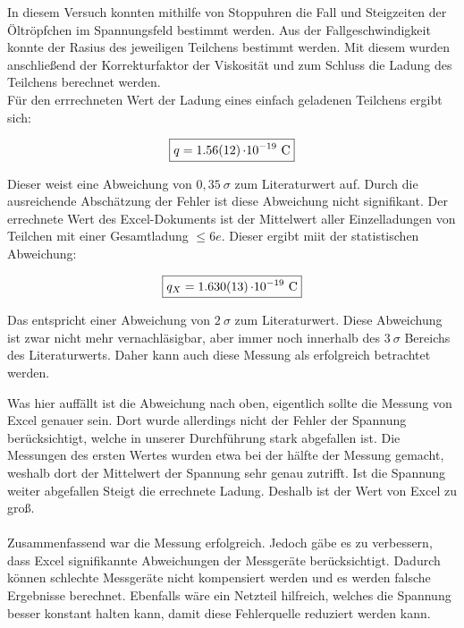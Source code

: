 In diesem Versuch konnten mithilfe von Stoppuhren die Fall und Steigzeiten der Öltröpfchen im Spannungsfeld bestimmt werden.
Aus der Fallgeschwindigkeit konnte der Rasius des jeweiligen Teilchens bestimmt werden.
Mit diesem wurden anschließend der Korrekturfaktor der Viskosität und zum Schluss die Ladung des Teilchens berechnet werden.\\
Für den errrechneten Wert der Ladung eines einfach geladenen Teilchens ergibt sich:

\[\boxed{q = \SI{1,56 \pm 0.12}{\cdot 10^{-19}\ \coulomb}}\]

Dieser weist eine Abweichung von $0,35\ \sigma$ zum Literaturwert auf.
Durch die ausreichende Abschätzung der Fehler ist diese Abweichung nicht signifikant.
Der errechnete Wert des Excel-Dokuments ist der Mittelwert aller Einzelladungen von Teilchen mit einer Gesamtladung $\le 6e$.
Dieser ergibt miit der statistischen Abweichung:

\[\boxed{q_X = \SI{1,630 \pm 0.013}{\cdot 10^{-19}\ \coulomb}}\]

Das entspricht einer Abweichung von $2\ \sigma$ zum Literaturwert.
Diese Abweichung ist zwar nicht mehr vernachläsigbar, aber immer noch innerhalb des $3\ \sigma$ Bereichs des Literaturwerts.
Daher kann auch diese Messung als erfolgreich betrachtet werden.

Was hier auffällt ist die Abweichung nach oben, eigentlich sollte die Messung von Excel genauer sein.
Dort wurde allerdings nicht der Fehler der Spannung berücksichtigt, welche in unserer Durchführung stark abgefallen ist. Die Messungen des ersten Wertes
wurden etwa bei der hälfte der Messung gemacht, weshalb dort der Mittelwert der Spannung sehr genau zutrifft.
Ist die Spannung weiter abgefallen Steigt die errechnete Ladung. Deshalb ist der Wert von Excel zu groß.\\ \\


Zusammenfassend war die Messung erfolgreich. Jedoch gäbe es zu verbessern, dass Excel signifikannte Abweichungen der Messgeräte berücksichtigt.
Dadurch können schlechte Messgeräte nicht kompensiert werden und es werden falsche Ergebnisse berechnet.
Ebenfalls wäre ein Netzteil hilfreich, welches die Spannung besser konstant halten kann, damit diese Fehlerquelle reduziert werden kann.